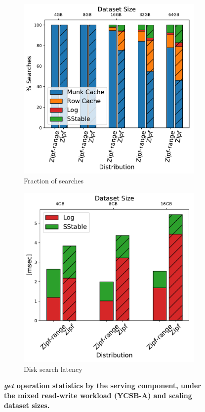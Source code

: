 \begin{figure}
\centering
\begin{subfigure}{0.49\linewidth}
\includegraphics[width=\textwidth]{figs/Time_percentage_A.pdf}
\caption{Fraction of searches}
\label{fig:readstat:dist}
\end{subfigure}
\begin{subfigure}{0.49\linewidth}
\includegraphics[width=\textwidth]{figs/Latency_A.pdf}
\caption{Disk search latency}
\label{fig:readstat:lat}
\end{subfigure}
\caption{\bf{\sys\/ {\em get\/} operation statistics by the serving component, under the mixed read-write workload (YCSB-A) and scaling dataset sizes.}}
\label{fig:readstat}
\end{figure}

